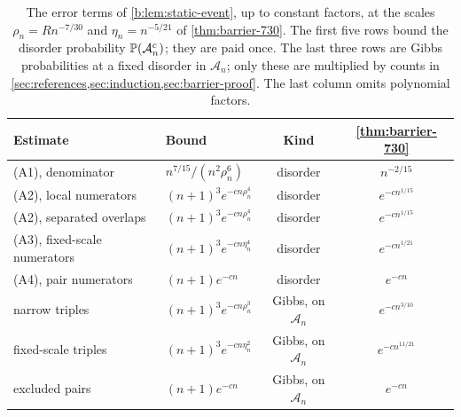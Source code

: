 \begin{table}[ht]
\centering
\small
\begin{tabular}{@{}llcc@{}}
\toprule
Estimate & Bound & Kind & \cref{thm:barrier-730}\\
\midrule
(A1), denominator & $n^{7/15}/(n^2\rho_n^6)$ & disorder & $n^{-2/15}$\\
(A2), local numerators & $(n+1)^3e^{-cn\rho_n^4}$ & disorder & $e^{-cn^{1/15}}$\\
(A2), separated overlaps & $(n+1)^3e^{-cn\rho_n^4}$ & disorder & $e^{-cn^{1/15}}$\\
(A3), fixed-scale numerators & $(n+1)^3e^{-cn\eta_n^4}$ & disorder & $e^{-cn^{1/21}}$\\
(A4), pair numerators & $(n+1)e^{-cn}$ & disorder & $e^{-cn}$\\
\midrule
narrow triples & $(n+1)^3e^{-cn\rho_n^3}$ & Gibbs, on $\mathcal A_n$ & $e^{-cn^{3/10}}$\\
fixed-scale triples & $(n+1)^3e^{-cn\eta_n^2}$ & Gibbs, on $\mathcal A_n$ & $e^{-cn^{11/21}}$\\
excluded pairs & $(n+1)e^{-cn}$ & Gibbs, on $\mathcal A_n$ & $e^{-cn}$\\
\bottomrule
\end{tabular}
\caption{The error terms of \cref{b:lem:static-event}, up to constant factors, at the scales $\rho_n=Rn^{-7/30}$ and $\eta_n=n^{-5/21}$ of \cref{thm:barrier-730}. The first five rows bound the disorder probability $\mathbb P(\mathcal A_n^c)$; they are paid once. The last three rows are Gibbs probabilities at a fixed disorder in $\mathcal A_n$; only these are multiplied by counts in \cref{sec:references,sec:induction,sec:barrier-proof}. The last column omits polynomial factors.}\label{tab:st-errors}
\end{table}

